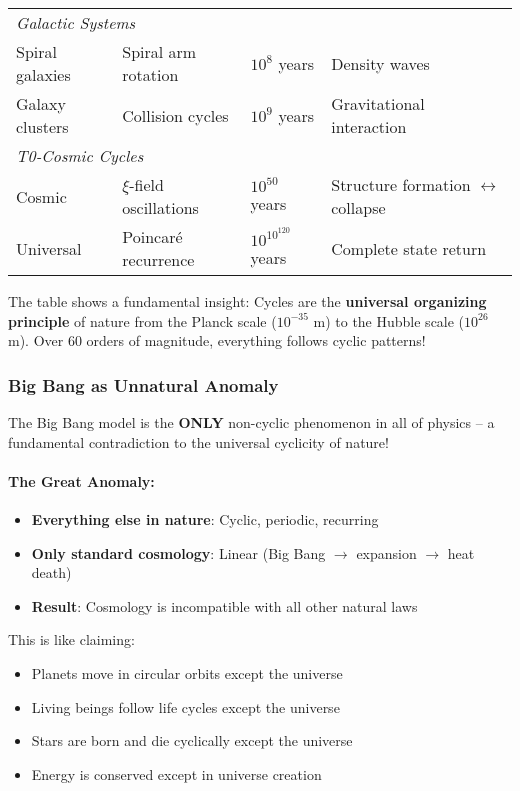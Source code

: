 \documentclass[12pt,a4paper]{article}
\theoremstyle{definition}
\begin{document}
\begin{longtable}{llll}
		\midrule
		\multicolumn{4}{l}{\emph{Galactic Systems}} \\
		Spiral galaxies & Spiral arm rotation & $10^8$ years & Density waves \\
		Galaxy clusters & Collision cycles & $10^9$ years & Gravitational interaction \\
		\midrule
		\multicolumn{4}{l}{\emph{T0-Cosmic Cycles}} \\
		Cosmic & $\xi$-field oscillations & $10^{50}$ years & Structure formation $\leftrightarrow$ collapse \\
		Universal & Poincaré recurrence & $10^{10^{120}}$ years & Complete state return \\
		\bottomrule
	\end{longtable}
	
	\begin{important}
		The table shows a fundamental insight: Cycles are the \textbf{universal organizing principle} of nature from the Planck scale ($10^{-35}$ m) to the Hubble scale ($10^{26}$ m). Over 60 orders of magnitude, everything follows cyclic patterns!
	\end{important}
	
	\subsubsection{Big Bang as Unnatural Anomaly}
	
	\begin{revolutionary}
		The Big Bang model is the \textbf{ONLY} non-cyclic phenomenon in all of physics -- a fundamental contradiction to the universal cyclicity of nature!
	\end{revolutionary}
	
	\paragraph{The Great Anomaly:}
	\begin{itemize}
		\item \textbf{Everything else in nature}: Cyclic, periodic, recurring
		\item \textbf{Only standard cosmology}: Linear (Big Bang $\to$ expansion $\to$ heat death)
		\item \textbf{Result}: Cosmology is incompatible with all other natural laws
	\end{itemize}
	
	This is like claiming:
	\begin{itemize}
		\item Planets move in circular orbits except the universe
		\item Living beings follow life cycles except the universe  
		\item Stars are born and die cyclically except the universe
		\item Energy is conserved except in universe creation
	\end{itemize}
	
\end{document}
